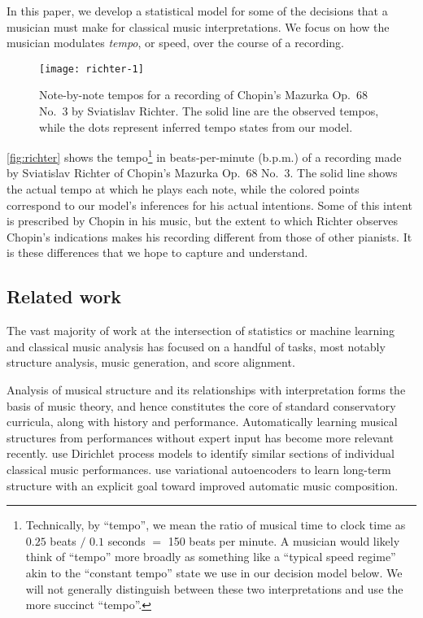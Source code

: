 \documentclass[12pt]{article}
\begin{document}
In this paper, we develop a statistical model for some of the
decisions that a musician must make for classical music
interpretations. We focus on how the musician modulates
{\it tempo}, or speed, over the course of a recording. 
\begin{figure}[t]
  \centering
  \texttt{[image: richter-1]}
  \caption{Note-by-note tempos for a recording of Chopin's Mazurka
    Op.\ 68 No.\ 3 by Sviatislav Richter. The solid line are the
    observed tempos, while the dots represent inferred tempo states
    from our model. }
  \label{fig:richter}
\end{figure}
\autoref{fig:richter} shows the tempo\footnote{Technically, by
  ``tempo'', we mean the ratio of musical time to clock time as $0.25$
  beats $/$ $0.1$ seconds $=$ 150 beats per minute. A musician would
  likely think of ``tempo'' more broadly as something like a ``typical
  speed regime'' akin to the ``constant tempo'' state we use in our
  decision model below. We will not generally distinguish between
  these two interpretations and use the more succinct ``tempo''.}
  in beats-per-minute (b.p.m.) of
a recording made by Sviatislav Richter of Chopin's Mazurka Op.\ 68
No.\ 3. The solid line shows the actual tempo at which he plays each
note, while the colored points correspond to our model's inferences
for his actual intentions. Some of this intent is prescribed  by
Chopin in his music, but the extent to which Richter observes Chopin's
indications makes his recording different from those of other
pianists. It is these differences that we hope to capture and understand.

\subsection{Related work}
\label{sec:related-work}


 
The vast majority of work at the intersection of statistics or machine
learning and classical music analysis has focused on a handful of tasks,
most notably structure analysis, music generation, and score
alignment.

Analysis of musical structure and its relationships with interpretation
forms the basis of music theory, and hence constitutes the core of standard
conservatory curricula, along with history and performance. Automatically learning musical structures
from performances without expert input has become more relevant
recently. \citet{RenDunson2010} use Dirichlet process models to identify
similar sections of individual classical music
performances. \citet{RobertsEngel2018} use variational autoencoders to
learn long-term structure with an explicit goal toward improved
automatic music composition.
\end{document}
